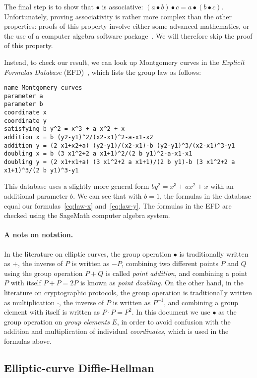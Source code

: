 \documentclass{article}
\begin{document}
The final step is to show that $\bullet$ is associative: $(a \bullet b) \bullet c = a \bullet (b \bullet c)$.
Unfortunately, proving associativity is rather more complex than the other properties: proofs of this property involve either some advanced mathematics, or the use of a computer algebra software package~\cite{Friedl:2017js,Fujii:2017eb}.
We will therefore skip the proof of this property.

Instead, to check our result, we can look up Montgomery curves in the \emph{Explicit Formulas Database} (EFD)~\cite{MontgomeryEFD}, which lists the group law as follows:
\begin{verbatim}
name Montgomery curves
parameter a
parameter b
coordinate x
coordinate y
satisfying b y^2 = x^3 + a x^2 + x
addition x = b (y2-y1)^2/(x2-x1)^2-a-x1-x2
addition y = (2 x1+x2+a) (y2-y1)/(x2-x1)-b (y2-y1)^3/(x2-x1)^3-y1
doubling x = b (3 x1^2+2 a x1+1)^2/(2 b y1)^2-a-x1-x1
doubling y = (2 x1+x1+a) (3 x1^2+2 a x1+1)/(2 b y1)-b (3 x1^2+2 a x1+1)^3/(2 b y1)^3-y1
\end{verbatim}
This database uses a slightly more general form $b y^2 = x^3 + a x^2 + x$ with an additional parameter $b$.
We can see that with $b=1$, the formulas in the database equal our formulas~\eqref{eq:law-x} and~\eqref{eq:law-y}.
The formulas in the EFD are checked using the SageMath computer algebra system.

\paragraph{A note on notation.}
In the literature on elliptic curves, the group operation $\bullet$ is traditionally written as $+$, the inverse of $P$ is written as $-P$, combining two different points $P$ and $Q$ using the group operation $P+Q$ is called \emph{point addition}, and combining a point $P$ with itself $P+P=2P$ is known as \emph{point doubling}.
On the other hand, in the literature on cryptographic protocols, the group operation is traditionally written as multiplication $\cdot$, the inverse of $P$ is written as $P^{-1}$, and combining a group element with itself is written as $P \cdot P = P^2$.
In this document we use $\bullet$ as the group operation on \emph{group elements} $E$, in order to avoid confusion with the addition and multiplication of individual \emph{coordinates}, which is used in the formulas above.

\subsection{Elliptic-curve Diffie-Hellman}\label{sec:diffie-hellman}
\end{document}
